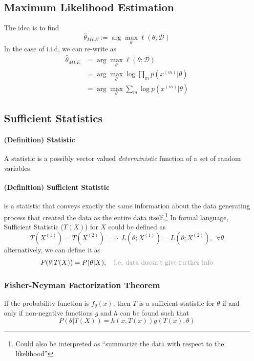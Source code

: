 \documentclass[11pt]{article}
\newcommand{\argmax}{\arg\max}
\begin{document}
\subsection{Maximum Likelihood Estimation}
The idea is to find
\begin{equation}
    \hat{\theta}_{MLE} := \argmax_\theta \ell(\theta; \mathcal{D})
\end{equation}
In the case of i.i.d, we can re-write as
\begin{align}
    \hat{\theta}_{MLE} &= \argmax_\theta \ell(\theta; \mathcal{D})\\
    &= \argmax_\theta \log \prod_{m} p\left(x^{(m)} | \theta\right) \\
    &= \argmax_\theta\sum_{m} \log p\left(x^{(m)} | \theta\right)
\end{align}

\subsection{Sufficient Statistics}
\paragraph{(Definition) Statistic}
A statistic is a possibly vector valued \textit{deterministic} function of a set of random variables.

\paragraph{(Definition) Sufficient Statistic} 
is a statistic that conveys exactly the same information about the data generating process that created the data as the entire data itself.\footnote{Could also be interpreted as ``summarize the data with respect to the likelihood''} In formal language, Sufficient Statistic ($T(X)$) for $X$ could be defined as
\begin{equation}
    T(X^{(1)}) = T(X^{(2)})~ \implies~ L(\theta; X^{(1)}) = L(\theta; X^{(2)}), ~~\forall \theta
\end{equation}
alternatively, we can define it as
\begin{equation}
    P(\theta | T(X)) = P(\theta | X); ~~~\text{\color{Gray} i.e. data doesn't give further info}
\end{equation}
\subsubsection{Fisher-Neyman Factorization Theorem}
If the probability function is $f_\theta(x)$, then $T$ is a sufficient statistic for $\theta$ if and only if non-negative functions $g$ and $h$ can be found such that
\begin{equation}
    P(\theta | T(X))=h(x, T(x)) g(T(x), \theta)
\end{equation}
\end{document}
